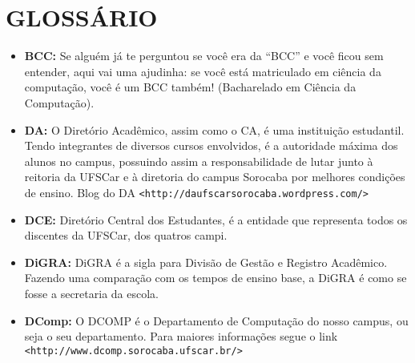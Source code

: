 \section{GLOSSÁRIO}
\begin{itemize}
  \item \textbf{BCC: } Se alguém já te perguntou se você era da “BCC” e você ficou sem entender, aqui vai uma ajudinha: se você está matriculado em ciência da computação, você é um BCC também! (Bacharelado em Ciência da Computação).
  \item \textbf{DA: } O Diretório Acadêmico, assim como o CA, é uma instituição estudantil. Tendo integrantes de diversos cursos envolvidos, é a autoridade máxima dos alunos no campus, possuindo assim a responsabilidade de lutar junto à reitoria da UFSCar e à diretoria do campus Sorocaba por melhores condições de ensino. Blog do DA 
    \newline \texttt{<http://daufscarsorocaba.wordpress.com/>}
  \item \textbf{DCE: } Diretório Central dos Estudantes, é a entidade que representa todos os discentes da UFSCar, dos quatros campi.
  \item \textbf{DiGRA: }DiGRA é a sigla para Divisão de Gestão e Registro Acadêmico. Fazendo uma comparação com os tempos de ensino base, a DiGRA é como se fosse a secretaria da escola.
  \item \textbf{DComp: }O DCOMP é o Departamento de Computação do nosso campus, ou seja o seu departamento. \newline Para maiores informações segue o link \texttt{<http://www.dcomp.sorocaba.ufscar.br/>}
\end{itemize}
